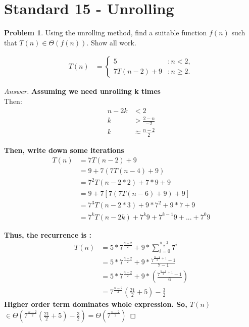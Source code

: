 \documentclass[11pt]{article}
\theoremstyle{definition}
\theoremstyle{definition}
\newtheorem{required}{Problem}
\theoremstyle{definition}
\begin{document}
\newpage
\section{Standard 15 - Unrolling}
\begin{required}
Using the unrolling method, find a suitable function $f(n)$ such that $T(n) \in \Theta(f(n))$. Show all work.

\begin{align*}
T(n) &= \begin{cases} 
5 & : n < 2, \\
7T(n-2) + 9 & : n \geq 2.
\end{cases}
\end{align*}
\end{required}

\begin{proof}[Answer]
\textbf{Assuming we need unrolling k times\\}
Then:\\
\begin{align*}
n-2k &< 2 \\
k &>  \frac {2-n}{-2}\\
k &\approx \frac{n-2}{2}
\end{align*}

\textbf{Then, write down some iterations\\}
\begin{align*}
T(n) &= 7T(n-2)+9\\
&= 9 + 7 (7T(n-4) + 9)\\
&= 7^{2} T(n-2*2)+7*9 + 9\\
&= 9 + 7[7(7T(n-6)+9)+ 9]\\
&= 7^3 T(n-2*3) + 9*7^2 + 9*7 + 9\\
&= 7^{k}T(n-2k) + 7^{k}9 + 7^{k-1}9 +... + 7^{0}9
\end{align*}

\textbf{Thus, the recurrence is :\\ }
\begin{align*}
T(n) &= 5 * 7^{\frac{n-2}{2}} +9* \sum_{i=0}^{\frac{n-2}{2}} 7^i\\
&=  5 * 7^{\frac{n-2}{2}} + 9* \frac {7^{\frac{n-2}{2} + 1} -1 }{7-1}\\
&= 5 * 7^{\frac{n-2}{2}} + 9* (\frac{7^{\frac{n-2}{2} + 1} -1}{6})\\
&= 7^{\frac{n-2}{2}}\left(\frac{21}{2}+5\right)-\frac{3}{2}
\end{align*}
\textbf{Higher order term dominates whole expression. So, $T(n)$ $\in \Theta(7^{\frac{n-2}{2}}\left(\frac{21}{2}+5\right)-\frac{3}{2}) = \Theta(7^{\frac{n-2}{2}})$} 
\end{proof}




\end{document}
